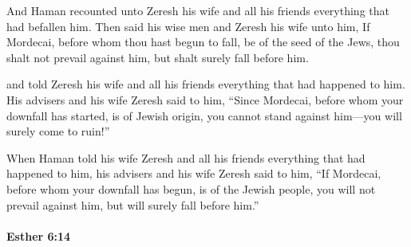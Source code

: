 			\begin{versebox}
					\item[BHS] 
					\item[LXX] 
					\item[ASV] And Haman recounted unto Zeresh his wife and all his friends everything that had befallen him. Then said his wise men and Zeresh his wife unto him, If Mordecai, before whom thou hast begun to fall, be of the seed of the Jews, thou shalt not prevail against him, but shalt surely fall before him.
					\item[NIV] and told Zeresh his wife and all his friends everything that had happened to him. His advisers and his wife Zeresh said to him, “Since Mordecai, before whom your downfall has started, is of Jewish origin, you cannot stand against him—you will surely come to ruin!”
					\item[NRSV] When Haman told his wife Zeresh and all his friends everything that had happened to him, his advisers and his wife Zeresh said to him, “If Mordecai, before whom your downfall has begun, is of the Jewish people, you will not prevail against him, but will surely fall before him.”
			\end{versebox}

		\paragraph{Esther 6:14} %
			\label{ESTHER-6-14}

